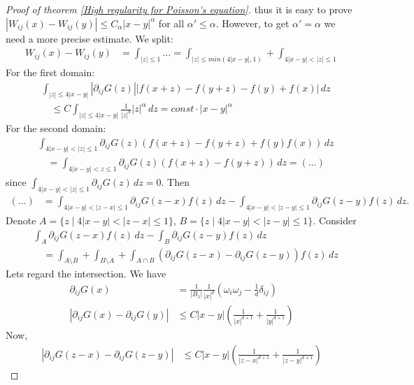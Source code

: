 \documentclass{report}
\theoremstyle{tommy}
\begin{document}
\begin{proof}[Proof of theorem \ref{High regularity for Poisson's equation}]
    thus it is easy to prove \(|W_{ij}(x) - W_{ij}(y)| \le C_\alpha |x-y|^\alpha\) for all \(\alpha' \le \alpha\). However, to get \(\alpha' = \alpha\) we need a more precise estimate. We split:
    \begin{align*}
      W_{ij}(x) - W_{ij}(y) 
      &= \int_{|z| \le 1} \dots = \int_{|z| \le min(4|x-y|, 1)} + \int_{4|x-y| < |z| \le 1}
    \end{align*}
    For the first domain:
    \begin{align*}
      &\int_{|z| \le 4 |x-y|} |\partial_{ij} G(z)| |f(x+z)-f(y+z)-f(y)+f(x)| \, dz \\
      &\quad \le C \int_{|z| \le 4|x-y|} \frac{1}{|z|^d} |z|^\alpha \, dz
      = const \cdot |x-y|^\alpha
    \end{align*}
    For the second domain:
    \begin{align*}
      &\int_{4|x-y| < |z| \le 1} \partial_{ij} G(z) (f(x+z) - f(y+z) + f(y)  f(x)) \, dz \\
      &\quad = \int_{4|x-y| < z \le 1} \partial_{ij} G(z) (f(x+z) - f(y+z)) \, dz = (\ldots)
    \end{align*}
    since \(\int_{4|x-y|<|z|\le1} \partial_{ij}G(z) \, dz = 0\). Then
    \begin{align*}
      (\ldots) &= \int_{4|x-y| < |z-x| \le 1} \partial_{ij} G(z-x) f(z) \, dz - \int_{4|x-y| < |z-y| \le 1} \partial_{ij} G(z-y) f(z) \, dz.
    \end{align*}
    Denote \(A = \{z \mid 4 |x-y| < |z-x| \le 1\}\), \(B = \{z \mid 4|x-y| < |z-y| \le 1\}\). Consider 
    \begin{align*}
      &\int_A \partial_{ij} G(z-x) f(z) \, dz - \int_B \partial_{ij} G(z-y) f(z) \, dz \\
      &\quad = \int_{A\setminus B} + \int_{B \setminus A} + \int_{A \cap B} (\partial_{ij} G(z-x) - \partial_{ij} G(z-y))f(z) \, dz
    \end{align*}
    Lets regard the intersection. We have \begin{align*}
      \partial_{ij} G(x) &= \frac{1}{|B_1|}\frac{1}{|x|^d} (\omega_i \omega_j - \frac{1}{d} \delta_{ij}) \\
      |\partial_{ij}G(x) - \partial_{ij}G(y)| &\le C|x-y| \left(\frac{1}{|x|^{d+1}} + \frac{1}{|y|^{d+1}}\right)
    \end{align*}
    Now, 
    \begin{align*}
      |\partial_{ij} G(z-x) - \partial_{ij} G(z-y)|
      &\le C |x-y| \left(\frac{1}{|z-x|^{d+1}} + \frac{1}{|z-y|^{d+1}}\right)
    \end{align*}

\end{proof}
\end{document}
